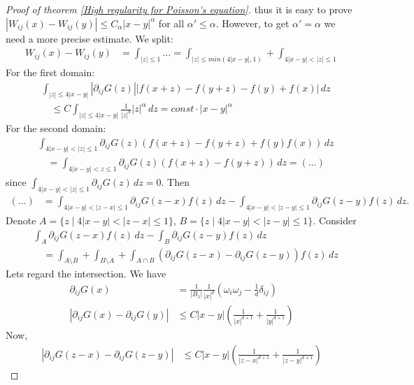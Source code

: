 \documentclass{report}
\theoremstyle{tommy}
\begin{document}
\begin{proof}[Proof of theorem \ref{High regularity for Poisson's equation}]
    thus it is easy to prove \(|W_{ij}(x) - W_{ij}(y)| \le C_\alpha |x-y|^\alpha\) for all \(\alpha' \le \alpha\). However, to get \(\alpha' = \alpha\) we need a more precise estimate. We split:
    \begin{align*}
      W_{ij}(x) - W_{ij}(y) 
      &= \int_{|z| \le 1} \dots = \int_{|z| \le min(4|x-y|, 1)} + \int_{4|x-y| < |z| \le 1}
    \end{align*}
    For the first domain:
    \begin{align*}
      &\int_{|z| \le 4 |x-y|} |\partial_{ij} G(z)| |f(x+z)-f(y+z)-f(y)+f(x)| \, dz \\
      &\quad \le C \int_{|z| \le 4|x-y|} \frac{1}{|z|^d} |z|^\alpha \, dz
      = const \cdot |x-y|^\alpha
    \end{align*}
    For the second domain:
    \begin{align*}
      &\int_{4|x-y| < |z| \le 1} \partial_{ij} G(z) (f(x+z) - f(y+z) + f(y)  f(x)) \, dz \\
      &\quad = \int_{4|x-y| < z \le 1} \partial_{ij} G(z) (f(x+z) - f(y+z)) \, dz = (\ldots)
    \end{align*}
    since \(\int_{4|x-y|<|z|\le1} \partial_{ij}G(z) \, dz = 0\). Then
    \begin{align*}
      (\ldots) &= \int_{4|x-y| < |z-x| \le 1} \partial_{ij} G(z-x) f(z) \, dz - \int_{4|x-y| < |z-y| \le 1} \partial_{ij} G(z-y) f(z) \, dz.
    \end{align*}
    Denote \(A = \{z \mid 4 |x-y| < |z-x| \le 1\}\), \(B = \{z \mid 4|x-y| < |z-y| \le 1\}\). Consider 
    \begin{align*}
      &\int_A \partial_{ij} G(z-x) f(z) \, dz - \int_B \partial_{ij} G(z-y) f(z) \, dz \\
      &\quad = \int_{A\setminus B} + \int_{B \setminus A} + \int_{A \cap B} (\partial_{ij} G(z-x) - \partial_{ij} G(z-y))f(z) \, dz
    \end{align*}
    Lets regard the intersection. We have \begin{align*}
      \partial_{ij} G(x) &= \frac{1}{|B_1|}\frac{1}{|x|^d} (\omega_i \omega_j - \frac{1}{d} \delta_{ij}) \\
      |\partial_{ij}G(x) - \partial_{ij}G(y)| &\le C|x-y| \left(\frac{1}{|x|^{d+1}} + \frac{1}{|y|^{d+1}}\right)
    \end{align*}
    Now, 
    \begin{align*}
      |\partial_{ij} G(z-x) - \partial_{ij} G(z-y)|
      &\le C |x-y| \left(\frac{1}{|z-x|^{d+1}} + \frac{1}{|z-y|^{d+1}}\right)
    \end{align*}

\end{proof}
\end{document}
